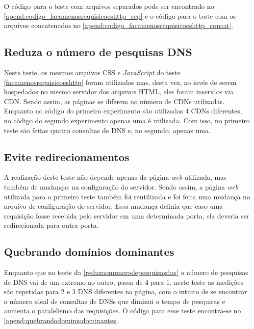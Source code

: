 O código para o teste com arquivos separados pode ser encontrado no \autoref{apend:codigo_facamenosrequisicoeshttp_sep} e o código para o teste com os arquivos concatenados no \autoref{apend:codigo_facamenosrequisicoeshttp_concat}.

\subsection{Reduza o número de pesquisas DNS}
\label{reduzaonumerodepesquisasdns}

Neste teste, os mesmos arquivos CSS e \textit{JavaScript} do teste \ref{facamenosrequisicoeshttp} foram utilizados mas, desta vez, ao invés de serem hospedados no mesmo servidor dos arquivos HTML, eles foram inseridos via CDN. Sendo assim, as páginas se diferem no número de CDNs utilizadas. Enquanto no código do primeiro experimento são utilizadas 4 CDNs diferentes, no código do segundo experimento apenas uma é utilizada. Com isso, no primeiro teste são feitas quatro consultas de DNS e, no segundo, apenas uma.

\subsection{Evite redirecionamentos}
\label{eviteredirecionamentos}

A realização deste teste não depende apenas da página \textit{web} utilizada, mas também de mudanças na configuração do servidor. Sendo assim, a página \textit{web} utilizada para o primeiro teste também foi reutilizada e foi feita uma mudança no arquivo de configuração do servidor. Essa mudança definia que caso uma requisição fosse recebida pelo servidor em uma determinada porta, ela deveria ser redirecionada para outra porta.

\subsection{Quebrando domínios dominantes}
\label{quebrandodominiosdominantes}

Enquanto que no teste da \autoref{reduzaonumerodepesquisasdns} o número de pesquisas de DNS vai de um extremo ao outro, passa de 4 para 1, neste teste as medições são repetidas para 2 e 3 DNS diferentes na página, com o intuito de se encontrar o número ideal de consultas de DNSs que diminui o tempo de pesquisas e aumenta o paralelismo das requisições. O código para esse teste encontra-se no \autoref{apend:quebrandodominiodominantes}.

